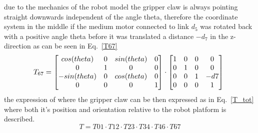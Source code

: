 due to the mechanics of the robot model the gripper claw is always pointing straight downwards independent of the angle theta, therefore the coordinate system in the middle if the medium motor connected to link \(d_5\) was rotated back with a positive angle theta before it was translated a distance \(-d_7\) in the z-direction as can be seen in Eq.~\eqref{T67}
\begin{equation}
\resizebox{0.8\hsize}{!}{$
    T_{67} =
    \begin{bmatrix}
    cos(theta)&0&sin(theta)&0\\
    0&1&0&0\\
    -sin(theta)&0&cos(theta)&0\\
    0&0&0&1\\
    \end{bmatrix}
    \cdot
     \begin{bmatrix}
    1&0&0&0\\
    0&1&0&0\\
    0&0&1&-d7\\
    0&0&0&1\\
    \end{bmatrix}
    $
    }
    \label{T67}
\end{equation}
the expression of where the gripper claw can be then expressed as in Eq.~\eqref{T_tot} where both it's position and orientation relative to the robot platform is described.
\begin{equation}
    T = T01\cdot T12\cdot T23 \cdot T34 \cdot T46 \cdot T67
    \label{T_tot}
\end{equation}
